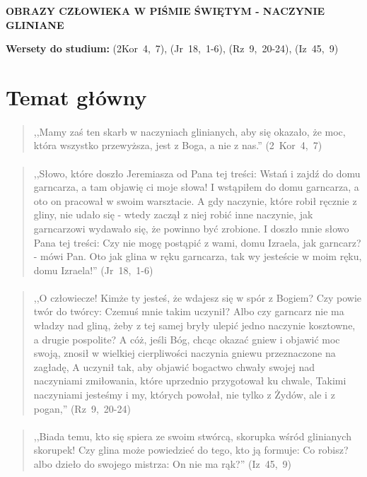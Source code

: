 \documentclass[10pt,a4paper,oneside]{article}
\begin{document}
\centerline{\textbf{\MakeUppercase{Obrazy człowieka w Piśmie Świętym - naczynie gliniane}}}
\begin{center}
\textbf{Wersety do studium:} \mbox{(2Kor 4, 7)}, \mbox{(Jr 18, 1-6)}, \mbox{(Rz 9, 20-24)}, \mbox{(Iz 45, 9)}
\end{center}
\section{Temat główny}
\paragraph{}
\begin{quote}
,,Mamy zaś ten skarb w naczyniach glinianych, aby się okazało, że moc, która wszystko przewyższa, jest z Boga, a nie z nas.'' \mbox{(2 Kor 4, 7)}
\end{quote}
\paragraph{}
\begin{quote}
,,Słowo, które doszło Jeremiasza od Pana tej treści: Wstań i zajdź do domu garncarza, a tam objawię ci moje słowa! I wstąpiłem do domu garncarza, a oto on pracował w swoim warsztacie. A gdy naczynie, które robił ręcznie z gliny, nie udało się - wtedy zaczął z niej robić inne naczynie, jak garncarzowi wydawało się, że powinno być zrobione. I doszło mnie słowo Pana tej treści: Czy nie mogę postąpić z wami, domu Izraela, jak garncarz? - mówi Pan. Oto jak glina w ręku garncarza, tak wy jesteście w moim ręku, domu Izraela!'' \mbox{(Jr 18, 1-6)}
\end{quote}
\paragraph{}
\begin{quote}
,,O człowiecze! Kimże ty jesteś, że wdajesz się w spór z Bogiem? Czy powie twór do twórcy: Czemuś mnie takim uczynił? Albo czy garncarz nie ma władzy nad gliną, żeby z tej samej bryły ulepić jedno naczynie kosztowne, a drugie pospolite? A cóż, jeśli Bóg, chcąc okazać gniew i objawić moc swoją, znosił w wielkiej cierpliwości naczynia gniewu przeznaczone na zagładę, A uczynił tak, aby objawić bogactwo chwały swojej nad naczyniami zmiłowania, które uprzednio przygotował ku chwale, Takimi naczyniami jesteśmy i my, których powołał, nie tylko z Żydów, ale i z pogan,'' \mbox{(Rz 9, 20-24)}
\end{quote}
\paragraph{}
\begin{quote}
,,Biada temu, kto się spiera ze swoim stwórcą, skorupka wśród glinianych skorupek! Czy glina może powiedzieć do tego, kto ją formuje: Co robisz? albo dzieło do swojego mistrza: On nie ma rąk?'' \mbox{(Iz 45, 9)}
\end{quote}
\end{document}
